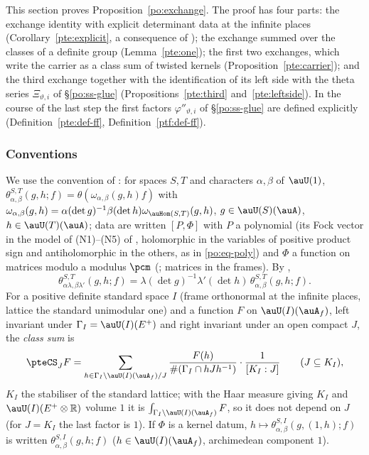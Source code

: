 \documentclass[10pt]{amsart}
\theoremstyle{definition}
\theoremstyle{remark}
\newcommand{\R}{\mathbb R}
\begin{document}
This section proves Proposition~\ref{po:exchange}. The proof has four parts: the exchange
identity with explicit determinant data at the infinite places (Corollary~\ref{pte:explicit}, a
consequence of {\cite[Theorem~3.2]{P53}}); the exchange summed over the classes of a definite group
(Lemma~\ref{pte:one}); the first two exchanges, which write the carrier as a class sum of twisted
kernels (Proposition~\ref{pte:carrier}); and the third exchange together with the identification of
its left side with the theta series $\Xi_{\vartheta,i}$ of \S\ref{po:ss-glue}
(Propositions~\ref{pte:third} and~\ref{pte:leftside}). In the course of the last step the first
factors $\varphi''_{\vartheta,i}$ of \S\ref{po:ss-glue} are defined explicitly (Definition~\ref{pte:def-ff},
Definition~\ref{ptf:def-ff}).

\subsubsection{Conventions}\label{pte:ss-conv}

We use the convention of {\cite[\S3.1.1]{P53}}: for spaces $S,T$ and characters $\alpha,\beta$
of $\auU(1)$, $\theta^{S,T}_{\alpha,\beta}(g,h;f)=\theta(\omega_{\alpha,\beta}(g,h)f)$ with
$\omega_{\alpha,\beta}(g,h)=\alpha(\det g)^{-1}\beta(\det h)\omega_{\auHom(S,T)}(g,h)$, $g\in
\auU(S)(\auA)$, $h\in\auU(T)(\auA)$; data are written $[P,\Phi]$ with $P$ a polynomial (its Fock
vector in the model of (N1)--(N5) of {\cite[\S6.1]{P49}}, holomorphic in the variables of positive
product sign and antiholomorphic in the others, as in \eqref{po:eq-poly}) and $\Phi$ a function on
matrices modulo a modulus $\pcm$ ({\cite[\S2.3]{P53}}; matrices in the frames). By
{\cite[(14)]{P53}},
\begin{equation}\label{pte:eq-twist}
\theta^{S,T}_{\alpha\lambda,\beta\lambda'}(g,h;f)=\lambda(\det g)^{-1}\lambda'(\det h)\,\theta^{S,T}_{\alpha,\beta}(g,h;f).
\end{equation}
For a positive definite standard space $I$ (frame orthonormal at the infinite places, lattice the
standard unimodular one) and a function $F$ on $\auU(I)(\auA_f)$, left invariant under
$\Gamma_I=\auU(I)(E^+)$ and right invariant under an open compact $J$, the \emph{class sum} is
\[
\pteCS_J F=\sum_{h\in\Gamma_I\backslash\auU(I)(\auA_f)/J}\frac{F(h)}{\#(\Gamma_I\cap hJh^{-1})}\cdot
\frac{1}{[K_I:J]}\qquad(J\subseteq K_I),
\]
$K_I$ the stabiliser of the standard lattice; with the Haar measure giving $K_I$ and
$\auU(I)(E^+\otimes\R)$ volume $1$ it is $\int_{\Gamma_I\backslash\auU(I)(\auA_f)}F$, so it does not
depend on $J$ (for $J=K_I$ the last factor is $1$). If $\Phi$ is a kernel datum, $h\mapsto
\theta^{S,I}_{\alpha,\beta}(g,(1,h);f)$ is written $\theta^{S,I}_{\alpha,\beta}(g,h;f)$
($h\in\auU(I)(\auA_f)$, archimedean component $1$).
\end{document}
